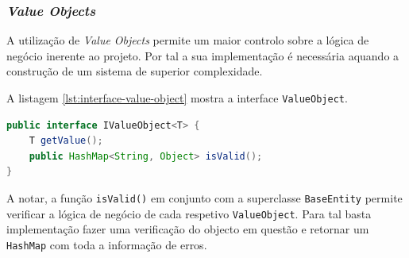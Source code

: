 \subsubsection{\textit{Value Objects}}
\label{sec:backend-value-objects}

A utilização de \textit{Value Objects} permite um maior controlo sobre a lógica de negócio inerente ao projeto. Por tal a sua implementação é necessária aquando a construção de um sistema de superior complexidade. 

A listagem \ref{lst:interface-value-object} mostra a interface \lstinline|ValueObject|.

\begin{lstlisting}[language=Java,caption={Interface \textit{Value Object}},label={lst:interface-value-object}]
public interface IValueObject<T> {
    T getValue();
    public HashMap<String, Object> isValid();
}
\end{lstlisting}

A notar, a função \lstinline|isValid()| em conjunto com a superclasse \lstinline|BaseEntity| permite verificar a lógica de negócio de cada respetivo \lstinline|ValueObject|. Para tal basta implementação fazer uma verificação do objecto em questão e retornar um \lstinline|HashMap| com toda a informação de erros.

